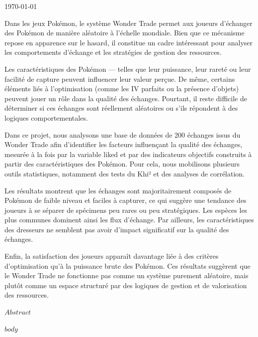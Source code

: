 \documentclass[mstat,12pt]{unswthesis}
\begin{document}
{\bigskip\bigskip\bigskip\noindent} \today





Dans les jeux Pokémon, le système Wonder Trade permet aux joueurs d'échanger des Pokémon de manière aléatoire à l'échelle mondiale. Bien que ce mécanisme repose en apparence sur le hasard, il constitue un cadre intéressant pour analyser les comportements d'échange et les stratégies de gestion des ressources.

{\medskip}

Les caractéristiques des Pokémon — telles que leur puissance, leur rareté ou leur facilité de capture peuvent influencer leur valeur perçue. De même, certains éléments liés à l'optimisation (comme les IV parfaits ou la présence d'objets) peuvent jouer un rôle dans la qualité des échanges. Pourtant, il reste difficile de déterminer si ces échanges sont réellement aléatoires ou s'ils répondent à des logiques comportementales.

{\medskip}

Dans ce projet, nous analysons une base de données de 200 échanges issus du Wonder Trade afin d'identifier les facteurs influençant la qualité des échanges, mesurée à la fois par la variable liked et par des indicateurs objectifs construits à partir des caractéristiques des Pokémon. Pour cela, nous mobilisons plusieurs outils statistiques, notamment des tests du Khi² et des analyses de corrélation.

{\medskip}

Les résultats montrent que les échanges sont majoritairement composés de Pokémon de faible niveau et faciles à capturer, ce qui suggère une tendance des joueurs à se séparer de spécimens peu rares ou peu stratégiques. Les espèces les plus communes dominent ainsi les flux d'échange. Par ailleurs, les caractéristiques des dresseurs ne semblent pas avoir d'impact significatif sur la qualité des échanges.

{\medskip}

Enfin, la satisfaction des joueurs apparaît davantage liée à des critères d'optimisation qu'à la puissance brute des Pokémon. Ces résultats suggèrent que le Wonder Trade ne fonctionne pas comme un système purement aléatoire, mais plutôt comme un espace structuré par des logiques de gestion et de valorisation des ressources.


$Abstract$



\afterpreface





%
%






$body$
\end{document}
